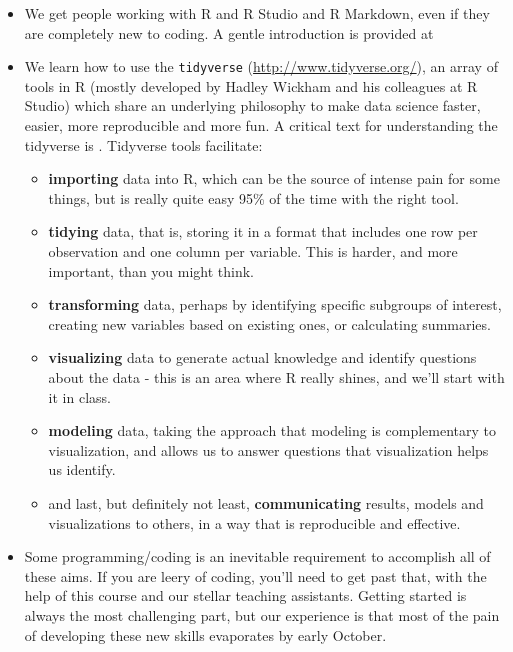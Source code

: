 \documentclass[
]{book}
\providecommand{\tightlist}{%
  \setlength{\itemsep}{0pt}\setlength{\parskip}{0pt}}
\begin{document}
\begin{itemize}
\tightlist
\item
  We get people working with R and R Studio and R Markdown, even if they are completely new to coding. A gentle introduction is provided at \citet{ModernDive}
\item
  We learn how to use the \texttt{tidyverse} (\url{http://www.tidyverse.org/}), an array of tools in R (mostly developed by Hadley Wickham and his colleagues at R Studio) which share an underlying philosophy to make data science faster, easier, more reproducible and more fun. A critical text for understanding the tidyverse is \citet{R4DS}. Tidyverse tools facilitate:

  \begin{itemize}
  \tightlist
  \item
    \textbf{importing} data into R, which can be the source of intense pain for some things, but is really quite easy 95\% of the time with the right tool.
  \item
    \textbf{tidying} data, that is, storing it in a format that includes one row per observation and one column per variable. This is harder, and more important, than you might think.
  \item
    \textbf{transforming} data, perhaps by identifying specific subgroups of interest, creating new variables based on existing ones, or calculating summaries.
  \item
    \textbf{visualizing} data to generate actual knowledge and identify questions about the data - this is an area where R really shines, and we'll start with it in class.
  \item
    \textbf{modeling} data, taking the approach that modeling is complementary to visualization, and allows us to answer questions that visualization helps us identify.
  \item
    and last, but definitely not least, \textbf{communicating} results, models and visualizations to others, in a way that is reproducible and effective.
  \end{itemize}
\item
  Some programming/coding is an inevitable requirement to accomplish all of these aims. If you are leery of coding, you'll need to get past that, with the help of this course and our stellar teaching assistants. Getting started is always the most challenging part, but our experience is that most of the pain of developing these new skills evaporates by early October.
\end{itemize}
\end{document}
